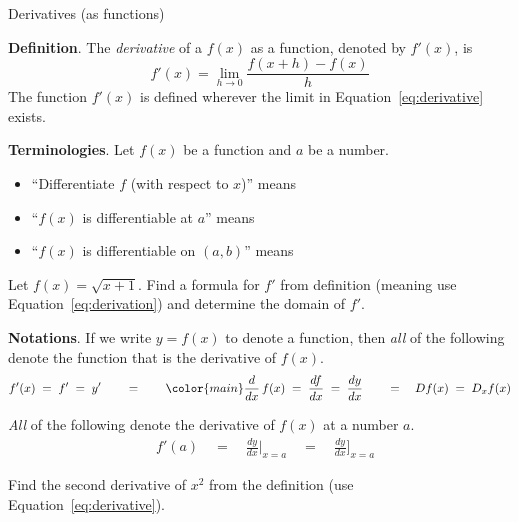 \documentclass[../main.tex]{subfiles}
\begin{document}
\begin{lesson}{Derivatives (as functions)}

\begin{mdframed}[style=withref]
  \textbf{Definition}. The \emph{derivative} of a \(f(x)\) as a function, denoted by \(f'(x)\), is
  \begin{equation} \label{eq:derivative}
    f'(x) = {\lim_{h \to 0} \frac{f(x+h) - f(x)}{h}}
  \end{equation}
  The function \(f'(x)\) is defined wherever the limit in Equation~\eqref{eq:derivative} exists.

\end{mdframed}
\textbf{Terminologies}. Let \(f(x)\) be a function and \(a\) be a number.
\begin{itemize}
  \item ``Differentiate \(f\) (with respect to \(x\))'' means \underline{\hspace{3in}}
  \item ``\(f(x)\) is differentiable at \(a\)'' means \underline{\hspace{3.62in}}
  \item ``\(f(x)\) is differentiable on \((a,b)\)'' means \underline{\hspace{3.36in}}
\end{itemize}

\bigskip
\begin{example}
  Let \(f(x) = \sqrt{x + 1}\). Find a formula for \(f'\) from definition (meaning use Equation~\eqref{eq:derivation}) and determine the domain of \(f'\).

\end{example}

\clearpage

\textbf{Notations}. If we write \(y = f(x)\) to denote a function, then \emph{all} of the following denote the function that is the derivative of \(f(x)\).
\[
  f'(x) 
  \;=\; f' 
  \;=\; y' 
  \qquad =\qquad  
  {\color{main} \frac{d}{dx}} \, f(x) \;=\; \frac{df}{dx} \;=\; \frac{dy}{dx}
  \qquad=\quad 
  Df(x) 
  \;=\; D_{x} f(x)
\]

\emph{All} of the following denote the derivative of \(f(x)\) at a number \(a\).
\begin{align*}
  & f'(a) \quad=\quad \frac{dy}{dx} \bigg|_{x = a} \quad=\quad \frac{dy}{dx} \bigg]_{x = a}
\end{align*}


\begin{example}
  Find the second derivative of \(x^{2}\) from the definition (use Equation~\eqref{eq:derivative}).


\end{example}
\end{lesson}
\end{document}
